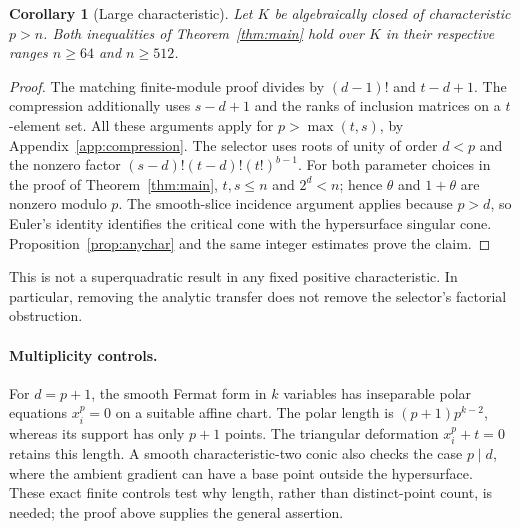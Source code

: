 \documentclass[11pt]{article}
\newtheorem{corollary}[theorem]{Corollary}
\theoremstyle{remark}\newtheorem{remark}[theorem]{Remark}
\begin{document}
\begin{corollary}[Large characteristic]\label{cor:largechar}
Let $K$ be algebraically closed of characteristic $p>n$.
Both inequalities of Theorem~\ref{thm:main} hold over $K$ in their
respective ranges $n\ge64$ and $n\ge512$.
\end{corollary}
\begin{proof}
The matching finite-module proof divides by $(d-1)!$ and $t-d+1$.
The compression additionally uses $s-d+1$ and the ranks of inclusion
matrices on a $t$-element set. All these arguments apply for
$p>\max(t,s)$, by Appendix~\ref{app:compression}.
The selector uses roots of unity of order $d<p$ and the nonzero factor
$(s-d)!(t-d)!(t!)^{b-1}$. For both parameter choices in the proof of
Theorem~\ref{thm:main}, $t,s\le n$ and $2^d<n$; hence $\theta$ and
$1+\theta$ are nonzero modulo $p$. The smooth-slice incidence argument
applies because $p>d$, so Euler's identity identifies the critical
cone with the hypersurface singular cone. Proposition~\ref{prop:anychar}
and the same integer estimates prove the claim.
\end{proof}

This is not a superquadratic result in any fixed positive
characteristic. In particular, removing the analytic transfer
does not remove the selector's factorial obstruction.

\paragraph{Multiplicity controls.}
For $d=p+1$, the smooth Fermat form in $k$ variables has
inseparable polar equations $x_i^p=0$ on a suitable affine chart.
The polar length is $(p+1)p^{k-2}$, whereas its support has only
$p+1$ points. The triangular deformation $x_i^p+t=0$ retains
this length. A smooth characteristic-two conic also checks the
case $p\mid d$, where the ambient gradient can have a base point
outside the hypersurface. These exact finite controls test why
length, rather than distinct-point count, is needed; the proof
above supplies the general assertion.



\end{document}
